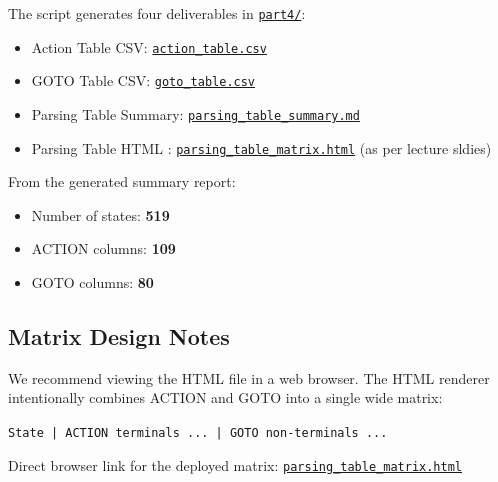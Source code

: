 \documentclass[a4paper,12pt]{article}
\begin{document}
The script generates four deliverables in \href{https://github.com/ShardulJunagade/compilers-cylite/blob/main/cylite_A3/part4}{\texttt{part4/}}:
\begin{itemize}
    \item Action Table CSV: \href{https://github.com/ShardulJunagade/compilers-cylite/blob/main/cylite_A3/part4/action_table.csv}{\texttt{action\_table.csv}}
    \item GOTO Table CSV: \href{https://github.com/ShardulJunagade/compilers-cylite/blob/main/cylite_A3/part4/goto_table.csv}{\texttt{goto\_table.csv}}
    \item Parsing Table Summary: \href{https://github.com/ShardulJunagade/compilers-cylite/blob/main/cylite_A3/part4/parsing_table_summary.md}{\texttt{parsing\_table\_summary.md}}
    \item Parsing Table HTML : \href{https://github.com/ShardulJunagade/compilers-cylite/blob/main/cylite_A3/part4/parsing_table_matrix.html}{\texttt{parsing\_table\_matrix.html}} (as per lecture sldies)
\end{itemize}


From the generated summary report:
\begin{itemize}
    \item Number of states: \textbf{519}
    \item ACTION columns: \textbf{109}
    \item GOTO columns: \textbf{80}
\end{itemize}

\subsection{Matrix Design Notes}

We recommend viewing the HTML file in a web browser. The HTML renderer intentionally combines ACTION and GOTO into a single wide matrix:
\begin{center}
\texttt{State | ACTION terminals ... | GOTO non-terminals ...}
\end{center}

Direct browser link for the deployed matrix:
\href{https://sharduljunagade.github.io/compilers-cylite/cylite_A3/part4/parsing_table_matrix.html}{\texttt{parsing\_table\_matrix.html}}
\end{document}
